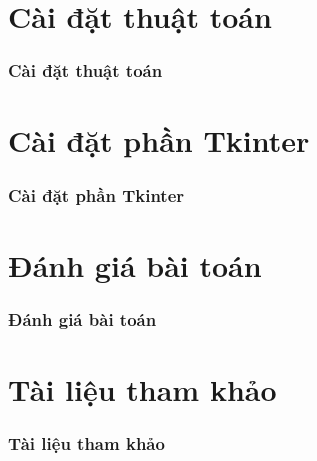 \documentclass[10.5pt]{beamer}
\begin{document}
\section{Cài đặt thuật toán}
\begin{frame}
	\frametitle{\fontsize{11.5pt}{12.5pt}\selectfont Cài đặt thuật toán}
\end{frame}

\section{Cài đặt phần Tkinter}
\begin{frame}
	\frametitle{\fontsize{11.5pt}{12.5pt}\selectfont Cài đặt phần Tkinter}
\end{frame}

\section{Đánh giá bài toán}
\begin{frame}
	\frametitle{\fontsize{11.5pt}{12.5pt}\selectfont Đánh giá bài toán}
\end{frame}

\section{Tài liệu tham khảo}
\begin{frame}
	\frametitle{\fontsize{11.5pt}{12.5pt}\selectfont Tài liệu tham khảo}
\end{frame}
\end{document}
